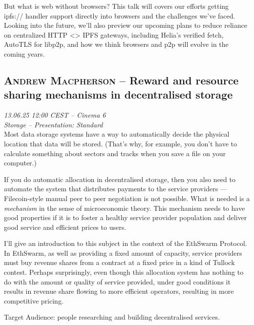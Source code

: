 But what is web without browsers? This talk will covers our efforts getting ipfs:// handler support directly into browsers and the challenges we've faced. Looking into the future, we'll also preview our upcoming plans to reduce reliance on centralized HTTP \textless{}\textgreater{} IPFS gateways, including Helia's verified fetch, AutoTLS for libp2p, and how we think browsers and p2p will evolve in the coming years.

\clearpage
\subsection {\textsc{Andrew Macpherson}  -- Reward and resource sharing mechanisms in decentralised storage} \noindent \textit {13.06.25 12:00 CEST -- Cinema 6\\ Storage -- Presentation: Standard}\\[1em] Most data storage systems have a way to automatically decide the physical location that data will be stored. (That's why, for example, you don't have to calculate something about sectors and tracks when you save a file on your computer.)

If you do automatic allocation in decentralised storage, then you also need to automate the system that distributes payments to the service providers — Filecoin-style manual peer to peer negotiation is not possible. What is needed is a \emph{mechanism} in the sense of microeconomic theory. This mechanism needs to have good properties if it is to foster a healthy service provider population and deliver good service and efficient prices to users.

I'll give an introduction to this subject in the context of the EthSwarm Protocol. In EthSwarm, as well as providing a fixed amount of capacity, service providers must buy revenue shares from a contract at a fixed price in a kind of Tullock contest. Perhaps surprisingly, even though this allocation system has nothing to do with the amount or quality of service provided, under good conditions it results in revenue share flowing to more efficient operators, resulting in more competitive pricing.

Target Audience: people researching and building decentralised services.

\clearpage
